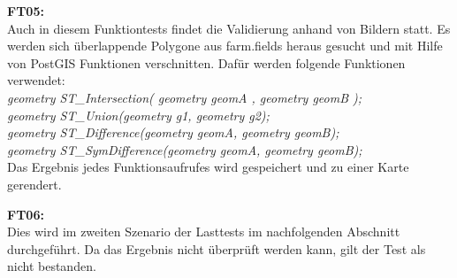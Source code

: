\textbf{FT05:}\\
Auch in diesem Funktiontests findet die Validierung anhand von Bildern statt.
Es werden sich überlappende Polygone aus farm.fields heraus gesucht und mit Hilfe von PostGIS Funktionen verschnitten.
Dafür werden folgende Funktionen verwendet:\\
\textit{geometry ST\_{}Intersection( geometry geomA , geometry geomB );}\\
\textit{geometry ST\_{}Union(geometry g1, geometry g2);}\\
\textit{geometry ST\_{}Difference(geometry geomA, geometry geomB);}\\
\textit{geometry ST\_{}SymDifference(geometry geomA, geometry geomB);}\\
Das Ergebnis jedes Funktionsaufrufes wird gespeichert und zu einer Karte gerendert.

\textbf{FT06:}\\
Dies wird im zweiten Szenario der Lasttests im nachfolgenden Abschnitt durchgeführt.
Da das Ergebnis nicht überprüft werden kann, gilt der Test als nicht bestanden.

